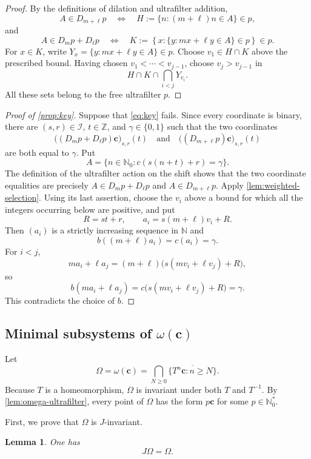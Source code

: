 \documentclass[reqno,12pt]{amsart}
\newtheorem{lemma}[thm]{Lemma}
\newcommand{\Nzero}{\mathbb N_0}
\newcommand{\Nstar}{\Nzero^{*}}
\def \N {\mathbb N}
\def \Z {\mathbb Z}
\numberwithin{equation}{section}
\begin{document}
\begin{proof}
By the definitions of dilation and ultrafilter addition,
\[
 A\in D_{m+\ell} p
 \quad\Longleftrightarrow\quad
 H:=\{n:(m+\ell)n\in A\}\in p,
\]
and
\[
 A\in D_m p+D_\ell p
 \quad\Longleftrightarrow\quad
 K:=\left\{x:\{y:mx+\ell y\in A\}\in p\right\}\in p.
\]
For $x\in K$, write $Y_x=\{y:mx+\ell y\in A\}\in p$. Choose
$v_1\in H\cap K$ above the prescribed bound. Having chosen
$v_1<\cdots<v_{j-1}$, choose $v_j>v_{j-1}$ in
\[
 H\cap K\cap\bigcap_{i<j}Y_{v_i}.
\]
All these sets belong to the free ultrafilter $p$.
\end{proof}

\begin{proof}[Proof of \cref{prop:key}]
Suppose that \eqref{eq:key} fails. Since every coordinate is binary, there
are $(s,r)\in\mathcal I$, $t\in\Z$, and $\gamma\in\{0,1\}$ such that the two
coordinates
\[
 \bigl((D_m p+D_\ell p)\mathbf c\bigr)_{s,r}(t)
 \quad\text{and}\quad
 \bigl((D_{m+\ell} p)\mathbf c\bigr)_{s,r}(t)
\]
are both equal to $\gamma$. Put
\[
 A=\{n\in\Nzero:c(s(n+t)+r)=\gamma\}.
\]
The definition of the ultrafilter action on the shift shows that the two
coordinate equalities are precisely
$A\in D_m p+D_\ell p$ and $A\in D_{m+\ell} p$. Apply
\cref{lem:weighted-selection}.  Using its last assertion, choose the
$v_i$ above a bound for which all the integers occurring below are
positive, and put
\[
 R=st+r,
 \qquad
 a_i=s(m+\ell)v_i+R.
\]
Then $(a_i)$ is a strictly increasing sequence in $\N$ and
\[
 b((m+\ell)a_i)=c(a_i)=\gamma.
\]
For $i<j$,
\[
 ma_i+\ell a_j
 =(m+\ell)\bigl(s(mv_i+\ell v_j)+R\bigr),
\]
so
\[
 b(ma_i+\ell a_j)
 =c\bigl(s(mv_i+\ell v_j)+R\bigr)=\gamma.
\]
This contradicts the choice of $b$.
\end{proof}

\subsection{Minimal subsystems of \texorpdfstring{$\omega(\mathbf c)$}{the omega-limit set}}

Let
\[
 \Omega=\omega(\mathbf c)
 =\bigcap_{N\geq0}\overline{\{T^n\mathbf c:n\geq N\}}.
\]
Because $T$ is a homeomorphism, $\Omega$ is invariant under both $T$ and
$T^{-1}$. By \cref{lem:omega-ultrafilter}, every point of $\Omega$ has
the form $p\mathbf c$ for some $p\in\Nstar$.

First, we prove that $\Omega$ is $J$-invariant.
\begin{lemma}\label{lem:JOmega}
One has
\begin{equation}\label{eq:JOmega}
 J\Omega=\Omega.
\end{equation}
\end{lemma}
\end{document}
